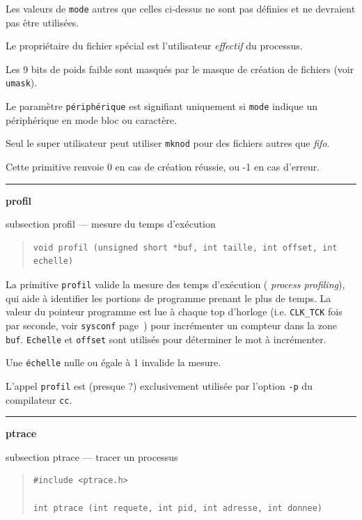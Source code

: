 \documentclass [twoside] {report}
\newcommand {\primitive} [1]
    {
	\phantomsection
	{\large \textbf {#1}}
	\addcontentsline {toc} {subsection} {#1}
    }
\newcommand {\separation}
    {
	\vspace {5mm}
	\nopagebreak
	\hrule
    }
\begin{document}
Les valeurs de \texttt {mode} autres que celles
ci-dessus ne sont pas définies et ne devraient pas
être utilisées.

Le propriétaire du fichier spécial est
l'utilisateur \textit {effectif} du processus.

Les 9 bits de poids faible sont masqués par le
masque de création de fichiers (voir \texttt {umask}).

Le paramètre \texttt {périphérique} est signifiant
uniquement si \texttt {mode} indique un périphérique en
mode bloc ou caractère.

Seul le super utilisateur peut utiliser \texttt {mknod}
pour des fichiers autres que \textit {fifo}.

Cette primitive renvoie 0 en cas de création
réussie, ou -1 en cas d'erreur.




\separation
\primitive {profil} --- mesure du temps d'exécution

\begin {quote}
\begin {verbatim}
void profil (unsigned short *buf, int taille, int offset, int echelle)
\end{verbatim}
\end {quote}

La primitive \texttt {profil} valide la mesure des temps d'exécution ({\it
process profiling}), qui aide à identifier les portions de programme
prenant le plus de temps. La valeur du pointeur programme est lue à
chaque top d'horloge (i.e. \texttt {CLK\_TCK} fois par seconde, voir
\texttt {sysconf} page~\pageref {sysconf}) pour incrémenter un compteur dans
la zone \texttt {buf}. \texttt {Echelle} et \texttt {offset} sont utilisés pour
déterminer le mot à incrémenter.

Une \texttt {échelle} nulle ou égale à 1 invalide la
mesure.

L'appel \texttt {profil} est (presque ?) exclusivement
utilisée par l'option \texttt {-p} du compilateur \texttt {cc}.




\separation
\primitive {ptrace} --- tracer un processus

\begin {quote}
\begin {verbatim}
#include <ptrace.h>

int ptrace (int requete, int pid, int adresse, int donnee)
\end{verbatim}
\end {quote}
\end{document}
